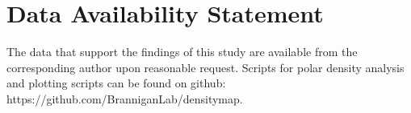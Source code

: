 \section*{Data Availability Statement}
The data that support the findings of this study are available from the corresponding author upon reasonable request. Scripts for polar density analysis and plotting scripts can be found on github: https://github.com/BranniganLab/densitymap. 






%
%



